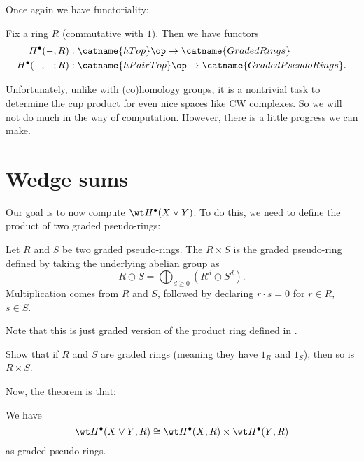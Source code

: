 Once again we have functoriality:
\begin{theorem}
	Fix a ring $R$ (commutative with $1$).
	Then we have functors
	\begin{align*}
		H^\bullet(-; R) &: \catname{hTop}\op \to \catname{GradedRings} \\
		H^\bullet(-,-; R) &: \catname{hPairTop}\op \to \catname{GradedPseudoRings}.
	\end{align*}
\end{theorem}

Unfortunately, unlike with (co)homology groups,
it is a nontrivial task to determine the cup product
for even nice spaces like CW complexes.
So we will not do much in the way of computation.
However, there is a little progress we can make.

\section{Wedge sums}
Our goal is to now compute $\wt H^\bullet(X \vee Y)$.
To do this, we need to define the product of two graded pseudo-rings:
\begin{definition}
	Let $R$ and $S$ be two graded pseudo-rings.
	The  $R \times S$ is the graded pseudo-ring
	defined by taking the underlying abelian group as
	\[ R \oplus S = \bigoplus_{d \ge 0} (R^d \oplus S^d). \]
	Multiplication comes from $R$ and $S$, followed by
	declaring $r \cdot s = 0$ for $r \in R$, $s \in S$.
\end{definition}
Note that this is just graded version of the product ring
defined in .
\begin{exercise}
	Show that if $R$ and $S$ are graded rings (meaning they have $1_R$ and $1_S$),
	then so is $R \times S$.
\end{exercise}

Now, the theorem is that:
\begin{theorem}
	We have
	\[
		\wt H^\bullet(X \vee Y; R)
		\cong \wt H^\bullet(X;R)
		\times \wt H^\bullet(Y;R)
	\]
	as graded pseudo-rings.
\end{theorem}

